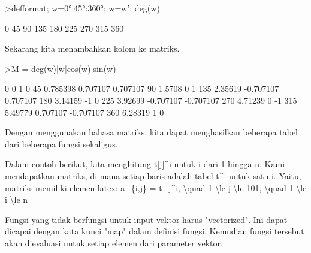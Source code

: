 \documentclass[a4paper,10pt]{article}
\begin{document}
\begin{eulernotebook}
\begin{eulercomment}
\begin{eulercomment}
\begin{eulercomment}
\begin{eulercomment}
\begin{eulercomment}
\begin{eulercomment}
\begin{eulerprompt}
>defformat; w=0°:45°:360°; w=w'; deg(w)
\end{eulerprompt}
\begin{euleroutput}
              0 
             45 
             90 
            135 
            180 
            225 
            270 
            315 
            360 
\end{euleroutput}
\begin{eulercomment}
Sekarang kita menambahkan kolom ke matriks.
\end{eulercomment}
\begin{eulerprompt}
>M = deg(w)|w|cos(w)|sin(w)
\end{eulerprompt}
\begin{euleroutput}
              0             0             1             0 
             45      0.785398      0.707107      0.707107 
             90        1.5708             0             1 
            135       2.35619     -0.707107      0.707107 
            180       3.14159            -1             0 
            225       3.92699     -0.707107     -0.707107 
            270       4.71239             0            -1 
            315       5.49779      0.707107     -0.707107 
            360       6.28319             1             0 
\end{euleroutput}
\begin{eulercomment}
Dengan menggunakan bahasa matriks, kita dapat menghasilkan beberapa
tabel dari beberapa fungsi sekaligus.

Dalam contoh berikut, kita menghitung t[j]\textasciicircum{}i untuk i dari 1 hingga n.
Kami mendapatkan matriks, di mana setiap baris adalah tabel t\textasciicircum{}i untuk
satu i. Yaitu, matriks memiliki elemen latex: a\_\{i,j\} = t\_j\textasciicircum{}i, \textbackslash{}quad 1
\textbackslash{}le j \textbackslash{}le 101, \textbackslash{}quad 1 \textbackslash{}le i \textbackslash{}le n

Fungsi yang tidak berfungsi untuk input vektor harus "vectorized". Ini
dapat dicapai dengan kata kunci "map" dalam definisi fungsi. Kemudian
fungsi tersebut akan dievaluasi untuk setiap elemen dari parameter
vektor.


\end{eulercomment}
\end{eulercomment}
\end{eulercomment}
\end{eulercomment}
\end{eulercomment}
\end{eulercomment}
\end{eulercomment}
\end{eulernotebook}
\end{document}
